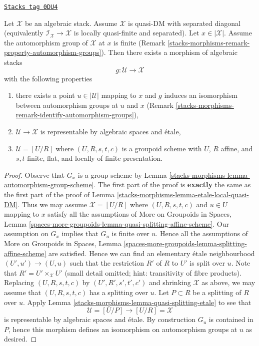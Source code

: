 \begin{lemma}
\label{stacks-morphisms-lemma-etale-local-quasi-DM-at-x}
\href{https://stacks.math.columbia.edu/tag/0DU4}{\texttt{Stacks tag 0DU4}}

Let $\mathcal{X}$ be an algebraic stack. Assume $\mathcal{X}$ is
quasi-DM with separated diagonal (equivalently
$\mathcal{I}_\mathcal{X} \to \mathcal{X}$ is locally quasi-finite and
separated). Let $x \in |\mathcal{X}|$. Assume the
automorphism group of $\mathcal{X}$ at $x$ is finite
(Remark \ref{stacks-morphisms-remark-property-automorphism-groups}).
Then there exists a morphism of algebraic stacks
$$
g : \mathcal{U} \longrightarrow \mathcal{X}
$$
with the following properties
\begin{enumerate}
\item there exists a point $u \in |\mathcal{U}|$ mapping to $x$ and
$g$ induces an isomorphism between automorphism groups at $u$ and $x$
(Remark \ref{stacks-morphisms-remark-identify-automorphism-groups}),
\item $\mathcal{U} \to \mathcal{X}$ is representable by algebraic spaces and
\'etale,
\item $\mathcal{U} = [U/R]$ where $(U, R, s, t, c)$ is a groupoid
scheme with $U$, $R$ affine, and $s, t$ finite, flat, and
locally of finite presentation.
\end{enumerate}
\end{lemma}

\begin{proof}
Observe that $G_x$ is a group scheme by
Lemma \ref{stacks-morphisms-lemma-automorphism-group-scheme}.
The first part of the proof is {\bf exactly} the same as the first part
of the proof of Lemma \ref{stacks-morphisms-lemma-etale-local-quasi-DM}.
Thus we may assume $\mathcal{X} = [U/R]$ where $(U, R, s, t, c)$
and $u \in U$ mapping to $x$ satisfy all the assumptions of
More on Groupoids in Spaces, Lemma
\ref{spaces-more-groupoids-lemma-quasi-splitting-affine-scheme}.
Our assumption on $G_x$ implies that $G_u$ is finite over $u$.
Hence all the assumptions of
More on Groupoids in Spaces, Lemma
\ref{spaces-more-groupoids-lemma-splitting-affine-scheme}
are satisfied.
Hence we can find an elementary \'etale neighbourhood
$(U', u') \to (U, u)$ such that the restriction $R'$ of $R$ to $U'$
is split over $u$. Note that $R' = U' \times_\mathcal{X} U'$
(small detail omitted; hint: transitivity of fibre products).
Replacing $(U, R, s, t, c)$ by $(U', R', s', t', c')$ and shrinking
$\mathcal{X}$ as above, we may assume that $(U, R, s, t, c)$ has
a splitting over $u$. Let $P \subset R$ be a splitting of $R$ over $u$.
Apply Lemma \ref{stacks-morphisms-lemma-quasi-splitting-etale} to see that
$$
\mathcal{U} = [U/P] \longrightarrow [U/R] = \mathcal{X}
$$
is representable by algebraic spaces and \'etale. By construction
$G_u$ is contained in $P$, hence this morphism defines an isomorphism
on automorphism groups at $u$ as desired.
\end{proof}

